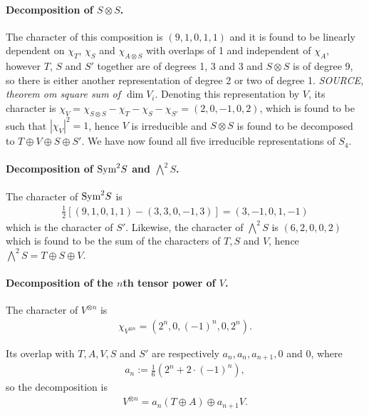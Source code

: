 \begin{example}
	\paragraph{Decomposition of $S \otimes S$.} The character of this composition is $(9,1,0,1,1)$ and it is found to be linearly dependent on $\chi_T$,  $\chi_S$ and $\chi_{A \otimes S}$ with overlaps of 1 and independent of $\chi_A$, however $T$, $S$ and $S'$ together are of degrees 1, 3 and 3 and $S \otimes S$ is of degree 9, so there is either another representation of degree 2 or two of degree 1. \textit{SOURCE, theorem om square sum of $\dim V_i$}. Denoting this representation by $V$, its character is $\chi_V = \chi_{S \otimes S} - \chi_T - \chi_S - \chi_{S'} = (2, 0, -1, 0, 2)$, which is found to be such that $|\chi_V|^2 = 1$, hence $V$ is irreducible and $S \otimes S$ is found to be decomposed to $T \oplus V \oplus S \oplus S'$. We have now found all five irreducible representations of $S_4$.
	
	
	\paragraph{Decomposition of $\text{Sym}^2S$ and $\bigwedge^2S$.} The character of $\text{Sym}^2S$ is 
	\begin{align*}
		\frac{1}{2}\left[ (9,1,0,1,1)-(3,3,0,-1,3) \right] = (3,-1,0,1,-1)
	\end{align*}
	which is the character of $S'$. Likewise, the character of $\bigwedge^2S$ is $(6,2,0,0,2)$ which is found to be the sum of the characters of $T, S$ and $V$, hence $\bigwedge^2S = T \oplus S \oplus V$.
	
	\paragraph{Decomposition of the $n$th tensor power of $V$.}
	
	The character of $V^{\otimes n}$ is
	\begin{align*}
		\chi_{V^{\otimes n}} = (2^n, 0, (-1)^n, 0, 2^n).
	\end{align*}
	
	Its overlap with $T, A, V, S$ and $S'$ are respectively $a_n, a_n, a_{n+1}, 0$ and $0$, where 
	\begin{align*}
		a_n := \frac{1}{6}\left( 2^n + 2 \cdot (-1)^n \right),
	\end{align*}
	so the decomposition is
	\begin{align*}
		V^{\otimes n} = a_n (T \oplus A) \oplus a_{n+1} V.
	\end{align*}
	

\end{example}
